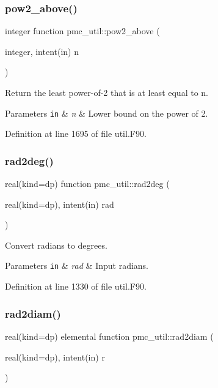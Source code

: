 \subsubsection{\texorpdfstring{pow2\+\_\+above()}{pow2\_above()}}
{\footnotesize\ttfamily integer function pmc\+\_\+util\+::pow2\+\_\+above (\begin{DoxyParamCaption}\item[{integer, intent(in)}]{n }\end{DoxyParamCaption})}



Return the least power-\/of-\/2 that is at least equal to n. 


\begin{DoxyParams}[1]{Parameters}
\mbox{\tt in}  & {\em n} & Lower bound on the power of 2. \\
\hline
\end{DoxyParams}


Definition at line 1695 of file util.\+F90.

\mbox{\label{namespacepmc__util_aee025b9d181017a7c928195ae1148b27}} 
\subsubsection{\texorpdfstring{rad2deg()}{rad2deg()}}
{\footnotesize\ttfamily real(kind=dp) function pmc\+\_\+util\+::rad2deg (\begin{DoxyParamCaption}\item[{real(kind=dp), intent(in)}]{rad }\end{DoxyParamCaption})}



Convert radians to degrees. 


\begin{DoxyParams}[1]{Parameters}
\mbox{\tt in}  & {\em rad} & Input radians. \\
\hline
\end{DoxyParams}


Definition at line 1330 of file util.\+F90.

\mbox{\label{namespacepmc__util_a69ab911167fab93d371e42476e9aac73}} 
\subsubsection{\texorpdfstring{rad2diam()}{rad2diam()}}
{\footnotesize\ttfamily real(kind=dp) elemental function pmc\+\_\+util\+::rad2diam (\begin{DoxyParamCaption}\item[{real(kind=dp), intent(in)}]{r }\end{DoxyParamCaption})}



